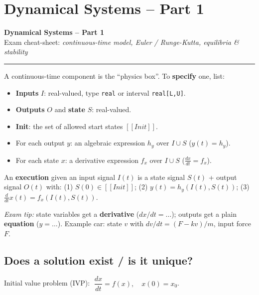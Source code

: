 \chapter{Dynamical Systems -- Part 1}



\begin{center}
{\Large\bfseries Dynamical Systems -- Part 1}\\[1pt]
{\small Exam cheat-sheet: \emph{continuous-time model, Euler / Runge-Kutta, equilibria \& stability}}
\end{center}
\hrule
\vspace{4pt}

A continuous-time component is the ``physics box''. To \textbf{specify} one, list:
\begin{itemize}
\item \textbf{Inputs} $I$: real-valued, type \texttt{real} or interval \texttt{real[L,U]}.
\item \textbf{Outputs} $O$ and \textbf{state} $S$: real-valued.
\item \textbf{Init}: the set of allowed start states $[\![Init]\!]$.
\item For each output $y$: an algebraic expression $h_y$ over $I\cup S$ \;($y(t)=h_y$).
\item For each state $x$: a derivative expression $f_x$ over $I\cup S$ \;($\tfrac{dx}{dt}=f_x$).
\end{itemize}
An \textbf{execution} given an input signal $I(t)$ is a state signal $S(t)$ + output signal $O(t)$ with:
\;(1) $S(0)\in[\![Init]\!]$;\;
(2) $y(t)=h_y(I(t),S(t))$;\;
(3) $\frac{d}{dt}x(t)=f_x(I(t),S(t))$.

\textit{Exam tip:} state variables get a \textbf{derivative} ($dx/dt=\dots$); outputs get a plain \textbf{equation} ($y=\dots$). Example car: state $v$ with $dv/dt=(F-kv)/m$, input force $F$.

\section{Does a solution exist / is it unique?}
Initial value problem (IVP): $\;\dfrac{dx}{dt}=f(x),\quad x(0)=x_0$.

